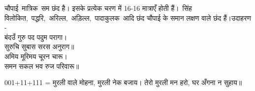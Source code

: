 ﻿चौपाई मात्रिक सम छंद है। इसके प्रत्येक चरण में 16-16 मात्राएँ होती हैं। सिंह विलोकित, पद्धरि, अरिल्ल, अड़िल्ल, पादाकुलक आदि छंद 
चौपाई के समान लक्षण वाले छंद हैं।उदाहरण -
\\
बंदउँ गुरु पद पदुम परागा।
\\
सुरुचि सुबास सरस अनुराग॥
\\
अमिय मूरिमय चूरन चारू।
\\
समन सकल भव रुज परिवारू॥

001+11+111 =
मुरली वाले मोहना, मुरली नेक बजाय।
तेरो मुरली मन हरो, घर अँगना न सुहाय॥
